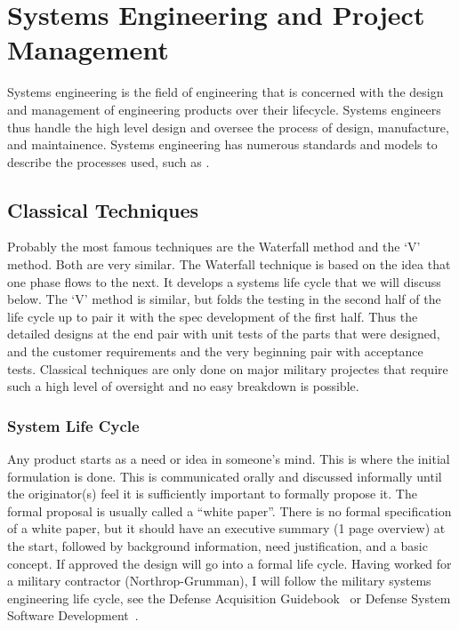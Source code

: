 \chapter{Systems Engineering and Project Management}

Systems engineering is the field of engineering that is concerned with the design and management of engineering products over their lifecycle.  Systems engineers thus handle the high level design and oversee the process of design, manufacture, and maintainence. Systems engineering has numerous standards and models to describe the processes used, such as \cite{ANSI632, CMMI, EIA731, IEEE1220, ISO15288}.

\section{Classical Techniques}
Probably the most famous techniques are the Waterfall method and the `V' method.  Both are very similar.  The Waterfall technique is based on the idea that one phase flows to the next.  It develops a systems life cycle that we will discuss below.  The `V' method is similar, but folds the testing in the second half of the life cycle up to pair it with the spec development of the first half.  Thus the detailed designs at the end pair with unit tests of the parts that were designed, and the customer requirements and the very beginning pair with acceptance tests.  Classical techniques are only done on major military projectes that require such a high level of oversight and no easy breakdown is possible.


\subsection{System Life Cycle}
Any product starts as a need or idea in someone's mind.  This is where the initial formulation is done.  This is communicated orally and discussed informally until the originator(s) feel it is sufficiently important to formally propose it.  The formal proposal is usually called a ``white paper''.  There is no formal specification of a white paper, but it should have an executive summary (1 page overview) at the start, followed by background information, need justification, and a basic concept.  If approved the design will go into a formal life cycle.  Having worked for a military contractor (Northrop-Grumman), I will follow the military systems engineering life cycle, see the Defense Acquisition Guidebook~\cite{DAG} or Defense System Software Development~\cite{DOD2167}.

